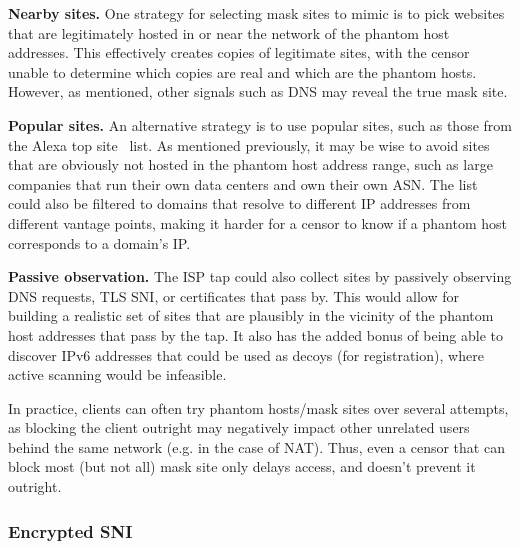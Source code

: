 \documentclass[letterpaper,twocolumn,10pt]{article}
\renewcommand{\paragraph}[1]{\smallskip\noindent\textbf{#1\quad}}
\begin{document}
\paragraph{Nearby sites.}
One strategy for selecting mask sites to mimic is to pick websites that are
legitimately hosted in or near the network of the phantom host addresses. This
effectively creates copies of legitimate sites, with the censor unable to
determine which copies are real and which are the phantom hosts. However, as
mentioned, other signals such as DNS may reveal the true mask site.

\paragraph{Popular sites.}
An alternative strategy is to use popular sites, such as those from the Alexa
top site~\cite{alexa-top500} list. As mentioned previously, it may be wise to avoid
sites that are obviously not hosted in the phantom host address range, such as
large companies that run their own data centers and own their own ASN.
The list could also be filtered to domains that resolve to different IP
addresses from different vantage points, making it harder for a censor to know
if a phantom host corresponds to a domain's IP.

\paragraph{Passive observation.}
The ISP tap could also collect sites by passively observing DNS requests, TLS
SNI, or certificates that pass by. This would allow for building a realistic set
of sites that are plausibly in the vicinity of the phantom host addresses
that pass by the tap. It also has the added bonus of being able to discover
IPv6 addresses that could be used as decoys (for registration), where active
scanning would be infeasible.

In practice, clients can often try phantom hosts/mask sites over
several attempts, as blocking the client outright may negatively impact other
unrelated users behind the same network (e.g. in the case of NAT). Thus, even a
censor that can block most (but not all) mask site only delays access, and
doesn't prevent it outright.

\subsubsection{Encrypted SNI}
\label{esni}
\end{document}
